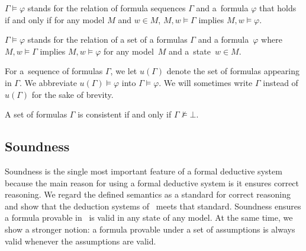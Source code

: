 \begin{notation}
$\Gamma\models\varphi$ stands for the relation of formula
 sequences $\Gamma$ and a~formula
 $\varphi$ that holds if and only if for any model $M$ 
and $w\in M$, $M,w\models \Gamma$ implies
 $M,w\models \varphi$.
\end{notation}

\begin{definition}
$\Gamma\models\varphi$ stands for the relation of a set of a formulas
 $\Gamma$ and a formula~$\varphi$ where $M,w\models \Gamma$ implies
 $M,w\models \varphi$ for any model~$M$ 
and a~state~$w\in M$.
\end{definition}
For a~sequence of formulas $\Gamma$, we let $u(\Gamma)$ denote the set of formulas
appearing in $\Gamma$.  We abbreviate $u(\Gamma)\models\varphi$ into
$\Gamma\models\varphi$. We will sometimes write $\Gamma$ instead of $u(\Gamma)$ for the
sake of brevity.

\begin{definition}
 A set of formulas $\Gamma$ is consistent if and only if $\Gamma\not\models \bot$.
\end{definition}

\subsection{Soundness}

Soundness is the single most important feature of a formal deductive system because the
main reason for using a formal deductive system is it ensures correct reasoning.
We regard the defined semantics as a standard for correct reasoning and show that the
deduction systems of \iec\, meets that standard.
Soundness ensures a formula provable in \iec\, is valid in any state of any model.
At the same time, we show a stronger notion:
a formula provable under a set of assumptions is always valid whenever the assumptions are
valid.

